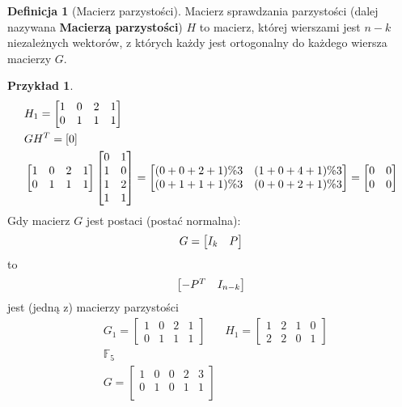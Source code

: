 \documentclass[a4paper,12pt]{article}
\theoremstyle{definition}%
\newtheorem{example}{Przykład}
\newtheorem*{example*}{Przykład} %
\theoremstyle{definition}
\newtheorem{definition}{Definicja}%
\theoremstyle{problem}
\begin{document}
\begin{definition}[Macierz parzystości]
Macierz sprawdzania parzystości (dalej nazywana \textbf{Macierzą parzystości}) $H$ to macierz, której wierszami jest $n-k$ niezależnych wektorów, z których każdy jest ortogonalny do każdego wiersza macierzy $G$.
\end{definition}
\begin{example*}
\begin{align*}
&H_1=\begin{bmatrix}
1&0&2&1\\0&1&1&1
\end{bmatrix}\\
&GH^T=[ {\Huge 0}]\\
&\begin{bmatrix}
1&0&2&1\\0&1&1&1
\end{bmatrix}\begin{bmatrix}
0&1\\1&0\\1&2\\1&1
\end{bmatrix}=\begin{bmatrix}
(0+0+2+1)\%3 & (1+0+4+1)\%3\\
(0+1+1+1)\%3 & (0+0+2+1)\%3 
\end{bmatrix}=\begin{bmatrix}
0&0\\
0&0
\end{bmatrix}
\end{align*}
Gdy macierz $G$ jest postaci (postać normalna):
$$G=\begin{bmatrix}
{\Huge I_k}& {\Huge P}
\end{bmatrix}$$
to
$$\begin{bmatrix}
{\Huge -P^T} & {\Huge I_{n-k}}
\end{bmatrix}$$ jest (jedną z) macierzy parzystości
\begin{align*}
&G_1=\begin{bmatrix}
1&0&2&1\\0&1&1&1
\end{bmatrix} & H_1=\begin{bmatrix}
1&2&1&0\\2&2&0&1
\end{bmatrix}\\
&\mathbb{F}_5\\
&G=\begin{bmatrix}
1&0&0&2&3\\
0&1&0&1&1\\

\end{bmatrix}
\end{align*}
\end{example*}
\end{document}

